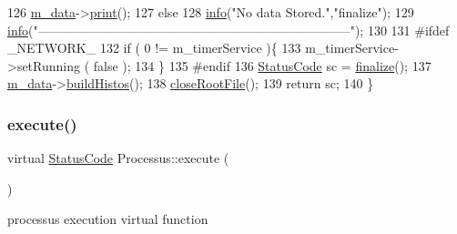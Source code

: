 \begin{DoxyCode}
126     \hyperlink{classProcessus_a3da9a9de8af54e2f47807a3e09dfccff}{m\_data}->\hyperlink{classData_a779ce878d01483220b49ad9e513d7366}{print}();
127   \textcolor{keywordflow}{else} 
128     \hyperlink{classObject_a644fd329ea4cb85f54fa6846484b84a8}{info}(\textcolor{stringliteral}{"No data Stored."},\textcolor{stringliteral}{"finalize"});
129   \hyperlink{classObject_a644fd329ea4cb85f54fa6846484b84a8}{info}(\textcolor{stringliteral}{"--------------------------------------------------------------------------"});
130 
131 \textcolor{preprocessor}{#ifdef \_NETWORK\_}
132   \textcolor{keywordflow}{if} ( 0 != m\_timerService )\{
133     m\_timerService->setRunning ( \textcolor{keyword}{false} );
134   \}
135 \textcolor{preprocessor}{#endif}
136   \hyperlink{classStatusCode}{StatusCode} sc = \hyperlink{classProcessus_aba93d691f031bdb18ae4b8afb1b2e856}{finalize}();
137   \hyperlink{classProcessus_a3da9a9de8af54e2f47807a3e09dfccff}{m\_data}->\hyperlink{classData_a0c21ebc7662b7a6e25171959689481ca}{buildHistos}();  
138   \hyperlink{classProcessus_a2f3c41e99da4c738ea3d8f7b0d20a665}{closeRootFile}();
139   \textcolor{keywordflow}{return} sc;
140 \}
\end{DoxyCode}
\mbox{\label{classProcessus_a63767a63a1fb0055c5aa45b21a4a5d58}} 
\subsubsection{\texorpdfstring{execute()}{execute()}}
{\footnotesize\ttfamily virtual \hyperlink{classStatusCode}{Status\+Code} Processus\+::execute (\begin{DoxyParamCaption}{ }\end{DoxyParamCaption})\hspace{0.3cm}{\ttfamily [pure virtual]}}

processus execution virtual function 

